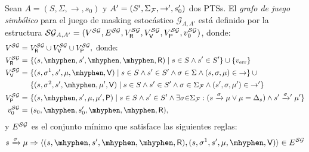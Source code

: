 \begin{definition} \label{def:symbolic_game_graph}
  Sean $A = ( S, \Sigma, {\rightarrow}, s_0 )$
  y $A' = ( S', \Sigma_{\mathcal{F}}, {\rightarrow'}, s'_0 )$
  dos PTSs.
  El \emph{grafo de juego simbólico} para el juego de masking estocástico
  $\mathcal{G}_{A,A'}$ está definido por la estructura
  $\mathcal{SG}_{A,A'} = ( V^{\mathcal{SG}}, E^{\mathcal{SG}}, V^{\mathcal{SG}}_{\mathsf{R}}, V^{\mathcal{SG}}_{\mathsf{V}}, V^{\mathcal{SG}}_{\mathsf{P}}, v_0^{\mathcal{SG}} )$,
  donde:
  {\footnotesize%
  \begin{align*}
    V^\SymbG = \
    & V^\SymbG_\Refuter \cup V^\SymbG_\Verifier \cup V^\SymbG_\Probabilistic, \text{ donde: }\\
    V^\SymbG_\Refuter = \
    & \{ (s, \mhyphen, s', \mhyphen, \mhyphen, \Refuter) \mid
          s \in S \wedge s' \in S' \} \cup
      \{\ErrorSt\}\\
    V^\SymbG_\Verifier = \
    & \{ (s, \sigma^1, s', \mu, \mhyphen, \Verifier) \mid
         s \in S \wedge s' \in S'
         \wedge \sigma \in \Sigma
         \wedge (s, \sigma, \mu) \in {\rightarrow} \} \cup {} \\
    & \{ (s, \sigma^2, s', \mhyphen, \mu', \Verifier) \mid
         s \in S \wedge s' \in S'
         \wedge \sigma \in \SigmaF
          \wedge (s', \sigma, \mu') \in {\rightarrow'} \} \\
    V^\SymbG_\Probabilistic = \
    & \{ (s, \mhyphen, s', \mu, \mu', \Probabilistic) \mid
         s \in S \wedge s' \in S' \wedge
         \exists \sigma{\in}\SigmaF : (s\xrightarrow{\sigma}\mu \vee \mu=\Dirac_s) \wedge s'\xrightarrowprime{\sigma}\mu'\}\\
    v_0^{\SymbG} = \
    & ( s_0, \mhyphen, s'_0, \mhyphen, \mhyphen, \Refuter ),
  \end{align*}
  }%
%
  y $E^{\mathcal{SG}}$ es el conjunto mínimo que satisface las siguientes reglas:
%
  {\footnotesize%
  \begin{align*}
    s \xrightarrow{\sigma} \mu
    & \Rightarrow \tuple{(s, \mhyphen, s', \mhyphen, \mhyphen, \Refuter), (s, \sigma^{1}, s', \mu, \mhyphen, \Verifier)}\in E^\SymbG \\

\end{align*}}
\end{definition}
